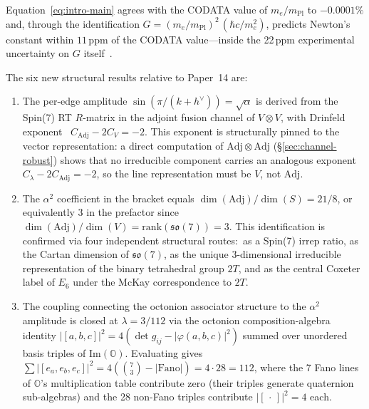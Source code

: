 \documentclass[11pt]{article}
\newcommand{\so}{\mathfrak{so}}
\newcommand{\Adj}{\mathrm{Adj}}
\newcommand{\mPl}{m_{\mathrm{Pl}}}
\newcommand{\hv}{h^{\vee}}
\newcommand{\rank}{\mathrm{rank}}
\begin{document}
Equation~\eqref{eq:intro-main} agrees with the CODATA value of
$m_e/\mPl$ to $-0.0001\%$ and, through the identification
$G = (m_e/\mPl)^2\,(\hbar c / m_e^2)$, predicts Newton's constant
within $11$\,ppm of the CODATA value---inside the 22\,ppm
experimental uncertainty on $G$ itself~\cite{codata2018}.

The six new structural results relative to Paper~14 are:

\begin{enumerate}
\item The per-edge amplitude $\sin(\pi/(k+\hv)) = \sqrt{\alpha}$ is
  derived from the Spin(7) RT $R$-matrix in the adjoint fusion
  channel of $V \otimes V$, with Drinfeld exponent~\cite{drinfeld1986}
  $C_\Adj - 2 C_V = -2$.  This exponent is structurally pinned to
  the vector representation: a direct computation of
  $\Adj \otimes \Adj$ (\S\ref{sec:channel-robust}) shows that no
  irreducible component carries an analogous exponent
  $C_\lambda - 2 C_\Adj = -2$, so the line representation must
  be $V$, not $\Adj$.

\item The $\alpha^2$ coefficient in the bracket equals
  $\dim(\Adj)/\dim(S) = 21/8$, or equivalently $3$ in the
  prefactor since $\dim(\Adj)/\dim(V) = \rank(\so(7)) = 3$.
  This identification is confirmed via four independent structural
  routes:\ as a Spin(7) irrep ratio, as the Cartan dimension of
  $\so(7)$, as the unique 3-dimensional irreducible
  representation of the binary tetrahedral group $2T$, and as
  the central Coxeter label of $E_6$ under the McKay correspondence
  to $2T$.

\item The coupling connecting the octonion associator structure
  to the $\alpha^2$ amplitude is closed at
  $\lambda = 3/112$ via the octonion composition-algebra identity
  $|[a,b,c]|^2 = 4(\det g_{ij} - |\varphi(a,b,c)|^2)$ summed
  over unordered basis triples of $\mathrm{Im}(\mathbb{O})$.
  Evaluating gives
  $\sum |[e_a,e_b,e_c]|^2 = 4(\binom{7}{3} - |\mathrm{Fano}|) = 4\cdot 28 = 112$,
  where the 7 Fano lines of $\mathbb{O}$'s multiplication table
  contribute zero (their triples generate quaternion
  sub-algebras) and the 28 non-Fano triples contribute $|[\,\cdot\,]|^2 = 4$
  each.


\end{enumerate}
\end{document}
